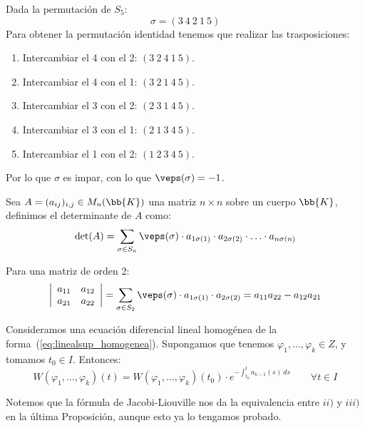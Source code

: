 \begin{ejemplo}
    Dada la permutación de $S_5$:
    \begin{equation*}
        \sigma = (3\ 4\ 2\ 1\ 5)
    \end{equation*}
    Para obtener la permutación identidad tenemos que realizar las trasposiciones:
    \begin{enumerate}
        \item Intercambiar el 4 con el 2: $(3\ 2\ 4\ 1\ 5)$.
        \item Intercambiar el 4 con el 1: $(3\ 2\ 1\ 4\ 5)$.
        \item Intercambiar el 3 con el 2: $(2\ 3\ 1\ 4\ 5)$.
        \item Intercambiar el 3 con el 1: $(2\ 1\ 3\ 4\ 5)$.
        \item Intercambiar el 1 con el 2: $(1\ 2\ 3\ 4\ 5)$.
    \end{enumerate}
    Por lo que $\sigma$ es impar, con lo que $\veps(\sigma)=-1$.
\end{ejemplo}

\begin{definicion}[Determinante]
    Sea $A=(a_{ij})_{i,j} \in M_n(\bb{K})$ una matriz $n\times n$ sobre un cuerpo $\bb{K}$, definimos el determinante de $A$ como:
    \begin{equation*}
        \det(A) = \sum_{\sigma\in S_n} \veps(\sigma)\cdot  a_{1\sigma(1)}\cdot a_{2\sigma(2)}\cdot \ldots \cdot a_{n\sigma(n)}
    \end{equation*}
\end{definicion}
\begin{ejemplo}
    Para una matriz de orden 2:
    \begin{equation*}
        \left|\begin{array}{cc}
            a_{11} & a_{12} \\
            a_{21} & a_{22}
        \end{array}\right| = \sum_{\sigma\in S_2} \veps(\sigma)\cdot a_{1\sigma(1)}\cdot a_{2\sigma(2)} = a_{11}a_{22} - a_{12}a_{21}
    \end{equation*}
\end{ejemplo}

\begin{teo}
Consideramos una ecuación diferencial lineal homogénea de la forma~(\ref{eq:linealsup_homogenea}). Supongamos que tenemos $\varphi_1,\ldots,\varphi_k\in Z$, y tomamos $t_0\in I$. Entonces:
\begin{equation*}
    W(\varphi_1,\ldots,\varphi_k)(t) = W(\varphi_1,\ldots,\varphi_k)(t_0) \cdot e^{\displaystyle-\int_{t_0}^{t} a_{k-1}(s)~ds } \qquad \forall t\in I
\end{equation*}
\end{teo}
Notemos que la fórmula de Jacobi-Liouville nos da la equivalencia entre $ii)$ y $iii)$ en la última Proposición, aunque esto ya lo tengamos probado.

